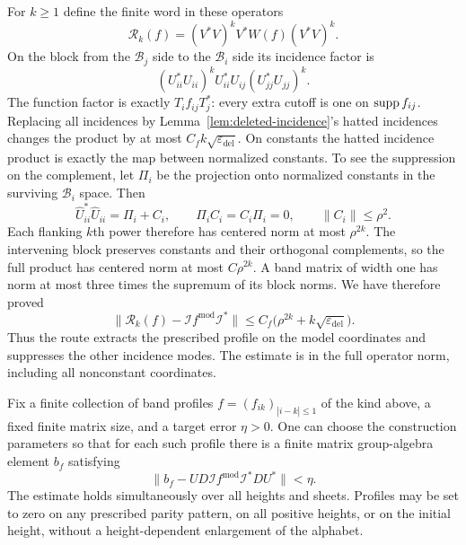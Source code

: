 For $k\ge1$ define the finite word in these operators
\begin{equation}\label{eq:constant-route}
 \mathcal R_k(f)=(V^*V)^kV^*W(f)(V^*V)^k.
\end{equation}
On the block from the $\mathscr B_j$ side to the $\mathscr B_i$ side its
incidence factor is
\[
 (U_{ii}^*U_{ii})^k U_{ii}^*U_{ij}(U_{jj}^*U_{jj})^k.
\]
The function factor is exactly $T_i f_{ij}T_j^*$: every extra cutoff is one
on $\operatorname{supp} f_{ij}$.  Replacing all incidences by
Lemma~\ref{lem:deleted-incidence}'s hatted incidences changes the product by
at most $C_f k\sqrt{\varepsilon_{\mathrm{del}}}$.  On constants the hatted
incidence product is exactly the map between normalized constants.
To see the suppression on the complement, let $\Pi_i$ be the projection
onto normalized constants in the surviving $\mathscr B_i$ space.  Then
\[
 \widehat U_{ii}^*\widehat U_{ii}=\Pi_i+C_i,\qquad
 \Pi_iC_i=C_i\Pi_i=0,\qquad \|C_i\|\le\rho^2.
\]
Each flanking $k$th power therefore has centered norm at most
$\rho^{2k}$.  The intervening block preserves constants and their
orthogonal complements, so the full product has centered norm at most
$C\rho^{2k}$.  A band matrix
of width one has norm at most three times the supremum of its block norms.
We have therefore proved
\begin{equation}\label{eq:constant-extraction-error}
 \|\mathcal R_k(f)-\mathcal I f^{\mathrm{mod}}\mathcal I^*\|
 \le C_f\bigl(\rho^{2k}+k\sqrt{\varepsilon_{\mathrm{del}}}\bigr).
\end{equation}
Thus the route extracts the prescribed profile on the model coordinates
and suppresses the other incidence modes.  The estimate is in the full
operator norm, including all nonconstant coordinates.

\begin{lemma}
\label{lem:finite-profile-realization}
Fix a finite collection of band profiles $f=(f_{ik})_{|i-k|\le1}$ of the
kind above, a fixed finite matrix size, and a target error $\eta>0$.
One can choose the construction parameters so that for each such profile
there is a finite matrix group-algebra element $b_f$ satisfying
\begin{equation}\label{eq:finite-profile-realization}
 \|b_f-UD\mathcal I f^{\mathrm{mod}}\mathcal I^*DU^*\|<\eta.
\end{equation}
The estimate holds simultaneously over all heights and sheets.  Profiles
may be set to zero on any prescribed parity pattern, on all positive heights,
or on the initial height, without a height-dependent enlargement of the
alphabet.
\end{lemma}


